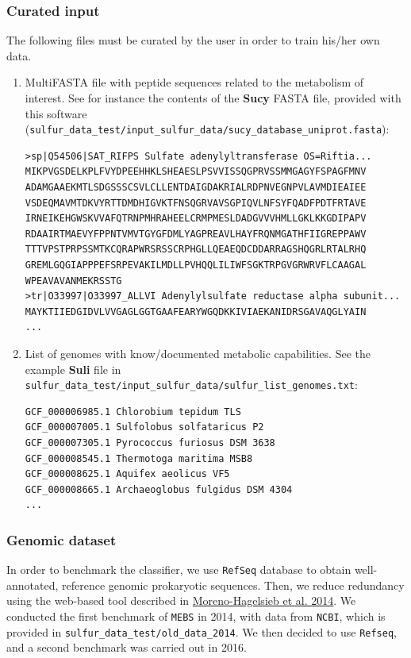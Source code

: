 \documentclass[12pt]{report}
\begin{document}
\subsubsection{Curated input}
The following files must be curated by the user in order to train his/her own data. 
\begin{enumerate}
\label{sucy}
\item  MultiFASTA file with peptide sequences related to the metabolism of
interest. See for instance the contents of the \textbf{Sucy} FASTA file, provided with this software 
(\verb+sulfur_data_test/input_sulfur_data/sucy_database_uniprot.fasta+):
\begin{verbatim}
>sp|Q54506|SAT_RIFPS Sulfate adenylyltransferase OS=Riftia...
MIKPVGSDELKPLFVYDPEEHHKLSHEAESLPSVVISSQGPRVSSMMGAGYFSPAGFMNV
ADAMGAAEKMTLSDGSSSCSVLCLLENTDAIGDAKRIALRDPNVEGNPVLAVMDIEAIEE
VSDEQMAVMTDKVYRTTDMDHIGVKTFNSQGRVAVSGPIQVLNFSYFQADFPDTFRTAVE
IRNEIKEHGWSKVVAFQTRNPMHRAHEELCRMPMESLDADGVVVHMLLGKLKKGDIPAPV
RDAAIRTMAEVYFPPNTVMVTGYGFDMLYAGPREAVLHAYFRQNMGATHFIIGREPPAWV
TTTVPSTPRPSSMTKCQRAPWRSRSSCRPHGLLQEAEQDCDDARRAGSHQGRLRTALRHQ
GREMLGQGIAPPPEFSRPEVAKILMDLLPVHQQLILIWFSGKTRPGVGRWRVFLCAAGAL
WPEAVAVANMEKRSSTG
>tr|O33997|O33997_ALLVI Adenylylsulfate reductase alpha subunit...
MAYKTIIEDGIDVLVVGAGLGGTGAAFEARYWGQDKKIVIAEKANIDRSGAVAQGLYAIN
...
\end{verbatim}

\item List of genomes with know/documented metabolic capabilities. See the example \textbf{Suli} file in \verb+sulfur_data_test/input_sulfur_data/sulfur_list_genomes.txt+: 
\label{suli}
\begin{verbatim}
GCF_000006985.1	Chlorobium tepidum TLS
GCF_000007005.1	Sulfolobus solfataricus P2
GCF_000007305.1	Pyrococcus furiosus DSM 3638
GCF_000008545.1	Thermotoga maritima MSB8
GCF_000008625.1	Aquifex aeolicus VF5
GCF_000008665.1	Archaeoglobus fulgidus DSM 4304
...
\end{verbatim}

\end{enumerate}

\subsubsection{Genomic dataset}

In order to benchmark the classifier, we use \texttt{RefSeq} database to obtain  well-annotated, reference genomic prokaryotic sequences. Then, we reduce redundancy using the web-based tool described in \href{http://bioinformatics.oxfordjournals.org/content/early/2013/02/27/bioinformatics.btt064.full}{Moreno-Hagelsieb et al. 2014}.
We conducted the first benchmark of \texttt{MEBS} in 2014, with data from
\texttt{NCBI}, which is provided in \verb+sulfur_data_test/old_data_2014+. We then decided to use \texttt{Refseq}, and a second benchmark was carried out in 2016.
\end{document}

